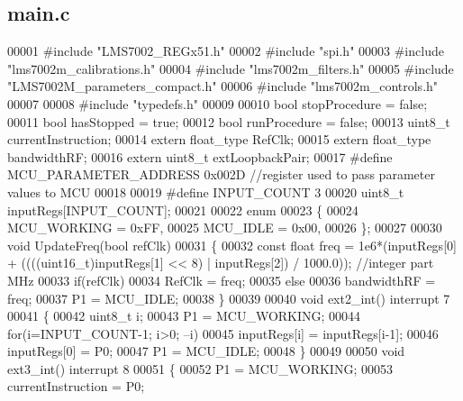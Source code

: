 \subsection{main.\+c}
\label{main_8c_source}

\begin{DoxyCode}
00001 \textcolor{preprocessor}{#include "LMS7002_REGx51.h"}
00002 \textcolor{preprocessor}{#include "spi.h"}
00003 \textcolor{preprocessor}{#include "lms7002m_calibrations.h"}
00004 \textcolor{preprocessor}{#include "lms7002m_filters.h"}
00005 \textcolor{preprocessor}{#include "LMS7002M_parameters_compact.h"}
00006 \textcolor{preprocessor}{#include "lms7002m_controls.h"}
00007 
00008 \textcolor{preprocessor}{#include "typedefs.h"}
00009 
00010 \textcolor{keywordtype}{bool} stopProcedure = \textcolor{keyword}{false};
00011 \textcolor{keywordtype}{bool} hasStopped = \textcolor{keyword}{true};
00012 \textcolor{keywordtype}{bool} runProcedure = \textcolor{keyword}{false};
00013 uint8\_t currentInstruction;
00014 \textcolor{keyword}{extern} float_type RefClk;
00015 \textcolor{keyword}{extern} float_type bandwidthRF;
00016 \textcolor{keyword}{extern} uint8\_t extLoopbackPair;
00017 \textcolor{preprocessor}{#define MCU\_PARAMETER\_ADDRESS 0x002D //register used to pass parameter values to MCU}
00018 
00019 \textcolor{preprocessor}{#define INPUT\_COUNT 3}
00020 uint8\_t inputRegs[INPUT_COUNT];
00021 
00022 \textcolor{keyword}{enum}
00023 \{
00024     MCU_WORKING = 0xFF,
00025     MCU_IDLE = 0x00,
00026 \};
00027 
00030 \textcolor{keywordtype}{void} UpdateFreq(\textcolor{keywordtype}{bool} refClk)
00031 \{
00032     \textcolor{keyword}{const} \textcolor{keywordtype}{float} freq = 1e6*(inputRegs[0] + ((((uint16\_t)inputRegs[1] << 8) | 
      inputRegs[2]) / 1000.0)); \textcolor{comment}{//integer part MHz}
00033     \textcolor{keywordflow}{if}(refClk)
00034         RefClk = freq;
00035     \textcolor{keywordflow}{else}
00036         bandwidthRF = freq;
00037     P1 = MCU_IDLE;
00038 \}
00039 
00040 \textcolor{keywordtype}{void} ext2_int() interrupt 7
00041 \{
00042     uint8\_t i;
00043     P1 = MCU_WORKING;
00044     \textcolor{keywordflow}{for}(i=INPUT_COUNT-1; i>0; --i)
00045         inputRegs[i] = inputRegs[i-1];
00046     inputRegs[0] = P0;
00047     P1 = MCU_IDLE;
00048 \}
00049 
00050 \textcolor{keywordtype}{void} ext3_int() interrupt 8
00051 \{
00052     P1 = MCU_WORKING;
00053     currentInstruction = P0;

\end{DoxyCode}
